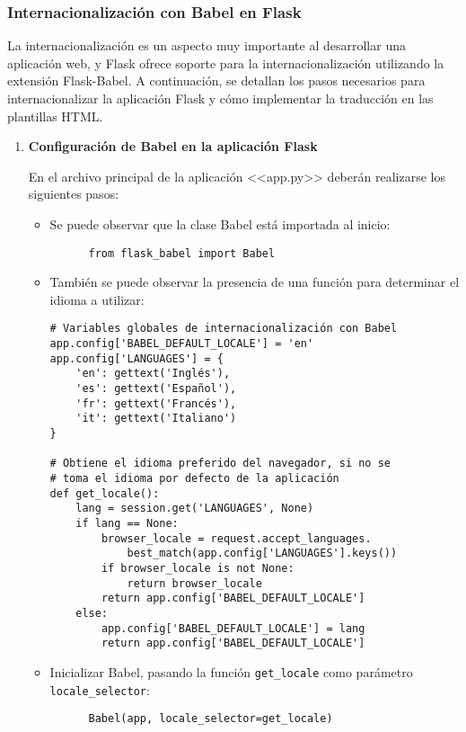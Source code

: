 \subsubsection{Internacionalización con Babel en Flask}

La internacionalización es un aspecto muy importante al desarrollar una aplicación web, y Flask ofrece soporte para la internacionalización utilizando la extensión Flask-Babel. A continuación, se detallan los pasos necesarios para internacionalizar la aplicación Flask y cómo implementar la traducción en las plantillas HTML.

\begin{enumerate}

  \item \textbf{Configuración de Babel en la aplicación Flask}

  En el archivo principal de la aplicación <<app.py>> deberán realizarse los siguientes pasos:

  \begin{itemize}
    \item Se puede observar que la clase Babel está importada al inicio:
      \begin{verbatim}
      from flask_babel import Babel
      \end{verbatim}

    \item También se puede observar la presencia de una función para determinar el idioma a utilizar:
      \begin{verbatim}
# Variables globales de internacionalización con Babel
app.config['BABEL_DEFAULT_LOCALE'] = 'en'
app.config['LANGUAGES'] = {
    'en': gettext('Inglés'),
    'es': gettext('Español'),
    'fr': gettext('Francés'),
    'it': gettext('Italiano')
}

# Obtiene el idioma preferido del navegador, si no se 
# toma el idioma por defecto de la aplicación
def get_locale():
    lang = session.get('LANGUAGES', None)
    if lang == None:
        browser_locale = request.accept_languages.
            best_match(app.config['LANGUAGES'].keys())
        if browser_locale is not None:
            return browser_locale
        return app.config['BABEL_DEFAULT_LOCALE']
    else:
        app.config['BABEL_DEFAULT_LOCALE'] = lang
        return app.config['BABEL_DEFAULT_LOCALE']
      \end{verbatim}

    \item Inicializar Babel, pasando la función \texttt{get\_locale} como parámetro \texttt{locale\_selector}:
      \begin{verbatim}
      Babel(app, locale_selector=get_locale)
      \end{verbatim}
  \end{itemize}


\end{enumerate}
